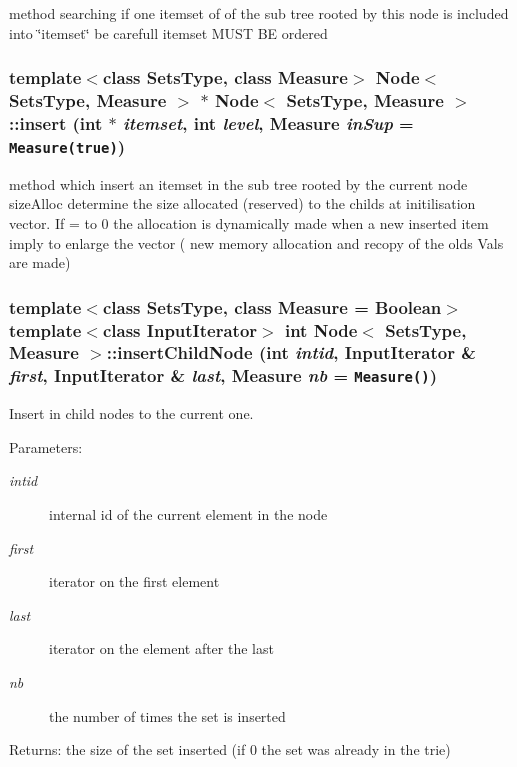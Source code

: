 method searching if one itemset of of the sub tree rooted by this node is included into \char`\"{}itemset\char`\"{} be carefull itemset MUST BE ordered 
\subsubsection{\setlength{\rightskip}{0pt plus 5cm}template$<$class Sets\-Type, class Measure$>$ {\bf Node}$<$ Sets\-Type, Measure $>$ $\ast$ {\bf Node}$<$ Sets\-Type, Measure $>$::insert (int $\ast$ {\em itemset}, int {\em level}, Measure {\em in\-Sup} = {\tt Measure(true)})}\label{class_node_7fade38fb4e2f586dd2287bcbfb9a6c8}


method which insert an itemset in the sub tree rooted by the current node size\-Alloc determine the size allocated (reserved) to the childs at initilisation vector. If = to 0 the allocation is dynamically made when a new inserted item imply to enlarge the vector ( new memory allocation and recopy of the olds Vals are made) 
\subsubsection{\setlength{\rightskip}{0pt plus 5cm}template$<$class Sets\-Type, class Measure = Boolean$>$ template$<$class Input\-Iterator$>$ int {\bf Node}$<$ Sets\-Type, Measure $>$::insert\-Child\-Node (int {\em intid}, Input\-Iterator \& {\em first}, Input\-Iterator \& {\em last}, Measure {\em nb} = {\tt Measure()})\hspace{0.3cm}{\tt  [inline]}}\label{class_node_6b56a65665f8100dc369fdda64691ee3}


Insert in child nodes to the current one. 

\begin{Desc}
\item[Parameters:]
\begin{description}
\item[{\em intid}]internal id of the current element in the node \item[{\em first}]iterator on the first element \item[{\em last}]iterator on the element after the last \item[{\em nb}]the number of times the set is inserted \end{description}
\end{Desc}
\begin{Desc}
\item[Returns:]the size of the set inserted (if 0 the set was already in the trie) \end{Desc}
